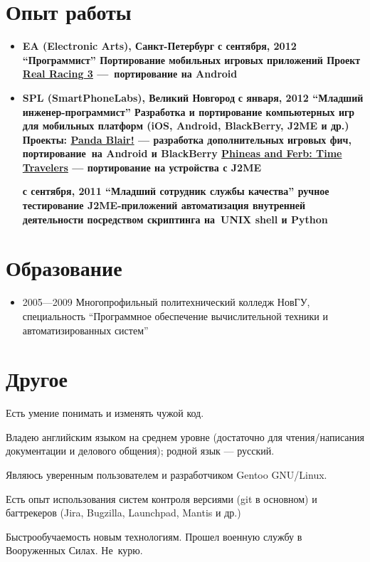 \section{Опыт работы}
\begin{itemize}
\item {
\fontsize{14pt}{14pt}\selectfont
\bfseries EA (Electronic Arts)\mdseries, Санкт-Петербург
}
\subitem \bfseries с сентября, 2012 ``Программист''\mdseries
\subsubitem Портирование мобильных игровых приложений
\subsubitem Проект \href{http://www.facebook.com/realracing}{Real Racing 3} ---\
портирование на Android

\item {
\fontsize{14pt}{14pt}\selectfont
\bfseries SPL (SmartPhoneLabs)\mdseries, Великий Новгород
}
\subitem \bfseries с января, 2012 ``Младший инженер-программист''\mdseries
\subsubitem Разработка и портирование компьютерных игр для мобильных платформ
(iOS, Android, BlackBerry, J2ME и др.)
\subsubitem Проекты:
\subsubitem\href{https://itunes.apple.com/us/app/panda-blair!/id500995558?mt=8}{Panda Blair!} --- разработка дополнительных игровых фич, портирование\
на Android и BlackBerry
\subsubitem\href{http://java.mob.org/game/phineas\_and\_ferb\_time\_travelers.html}{Phineas and Ferb: Time Travelers} --- портирование на устройства с J2ME

\subitem \bfseries с сентября, 2011 ``Младший сотрудник службы качества''
\mdseries
\subsubitem ручное тестирование J2ME-приложений
\subsubitem автоматизация внутренней деятельности посредством скриптинга на\
UNIX shell и Python
\end{itemize}

\section{Образование}
\begin{itemize}
\item 2005---2009 Многопрофильный политехнический колледж НовГУ, специальность
``Программное обеспечение вычислительной техники и автоматизированных систем''
\end{itemize}

\section{Другое}
Есть умение понимать и изменять чужой код.

Владею английским языком на среднем уровне (достаточно для чтения/написания
документации и делового общения); родной язык --- русский.

Являюсь уверенным пользователем и разработчиком Gentoo GNU/Linux.

Есть опыт использования систем контроля версиями (git в основном) и
багтрекеров (Jira, Bugzilla, Launchpad, Mantis и др.)

Быстрообучаемость новым технологиям.
Прошел военную службу в Вооруженных Силах.
Не~курю.
